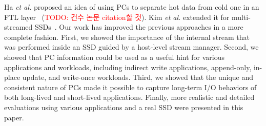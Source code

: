 Ha {\it et al.} proposed an idea of using PCs to separate hot data from cold
one in an FTL layer~\cite{ha} (\textcolor{red}{TODO: 건수 논문 citation할 것}). Kim {\it et al.} extended it for multi-streamed
SSDs~\cite{PCStream}.  Our work has improved the previous approaches in a more
complete fashion. First, we showed the importance of the internal stream that
was performed inside an SSD guided by a host-level stream manager. Second, we
showed that PC information could be used as a useful hint for various
applications and workloads, including indirect write applications, append-only,
in-place update, and write-once workloads. Third, we showed that the unique and
consistent nature of PCs made it possible to capture long-term I/O behaviors of
both long-lived and short-lived applications.  Finally, more realistic and
detailed evaluations using various applications and a real SSD were presented
in this paper.



